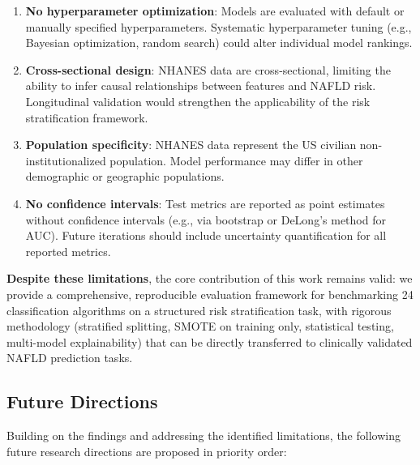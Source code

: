 \documentclass[conference,10pt]{IEEEtran}
\begin{document}
\begin{enumerate}
    \item \textbf{No hyperparameter optimization}: Models are evaluated with default or manually specified hyperparameters. Systematic hyperparameter tuning (e.g., Bayesian optimization, random search) could alter individual model rankings.

    \item \textbf{Cross-sectional design}: NHANES data are cross-sectional, limiting the ability to infer causal relationships between features and NAFLD risk. Longitudinal validation would strengthen the applicability of the risk stratification framework.

    \item \textbf{Population specificity}: NHANES data represent the US civilian non-institutionalized population. Model performance may differ in other demographic or geographic populations.

    \item \textbf{No confidence intervals}: Test metrics are reported as point estimates without confidence intervals (e.g., via bootstrap or DeLong's method for AUC). Future iterations should include uncertainty quantification for all reported metrics.
\end{enumerate}

\textbf{Despite these limitations}, the core contribution of this work remains valid: we provide a comprehensive, reproducible evaluation framework for benchmarking 24 classification algorithms on a structured risk stratification task, with rigorous methodology (stratified splitting, SMOTE on training only, statistical testing, multi-model explainability) that can be directly transferred to clinically validated NAFLD prediction tasks.

\subsection{Future Directions}

Building on the findings and addressing the identified limitations, the following future research directions are proposed in priority order:
\end{document}
